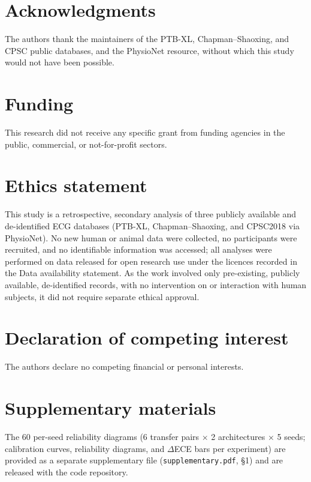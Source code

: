 \documentclass[review,12pt,nonatbib]{elsarticle}
\begin{document}
\section*{Acknowledgments}
The authors thank the maintainers of the PTB-XL, Chapman--Shaoxing,
and CPSC public databases, and the PhysioNet resource, without which
this study would not have been possible.

\section*{Funding}
This research did not receive any specific grant from funding
agencies in the public, commercial, or not-for-profit sectors.

\section*{Ethics statement}
This study is a retrospective, secondary analysis of three publicly
available and de-identified ECG databases (PTB-XL, Chapman--Shaoxing,
and CPSC2018 via PhysioNet). No new human or animal data were collected,
no participants were recruited, and no identifiable information was
accessed; all analyses were performed on data released for open research
use under the licences recorded in the Data availability statement. As
the work involved only pre-existing, publicly available, de-identified
records, with no intervention on or interaction with human subjects, it
did not require separate ethical approval.

\section*{Declaration of competing interest}
The authors declare no competing financial or personal interests.

\section*{Supplementary materials}
The 60 per-seed reliability diagrams
(6 transfer pairs $\times$ 2 architectures $\times$ 5 seeds; calibration
curves, reliability diagrams, and $\Delta$ECE bars per experiment) are
provided as a separate supplementary file
(\texttt{supplementary.pdf}, \S1) and are released with
the code repository.
\end{document}
